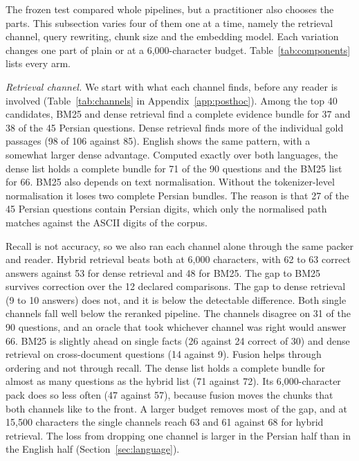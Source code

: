 The frozen test compared whole pipelines, but a practitioner also chooses the parts. This subsection varies four of them one at a time, namely the retrieval channel, query rewriting, chunk size and the embedding model. Each variation changes one part of plain \hybrid{} or \hr{} at a 6,000-character budget. Table~\ref{tab:components} lists every arm.


\emph{Retrieval channel.} We start with what each channel finds, before any reader is involved (Table~\ref{tab:channels} in Appendix~\ref{app:posthoc}). Among the top 40 candidates, BM25 and dense retrieval find a complete evidence bundle for 37 and 38 of the 45 Persian questions. Dense retrieval finds more of the individual gold passages (98 of 106 against 85). English shows the same pattern, with a somewhat larger dense advantage. Computed exactly over both languages, the dense list holds a complete bundle for 71 of the 90 questions and the BM25 list for 66. BM25 also depends on text normalisation. Without the tokenizer-level normalisation it loses two complete Persian bundles. The reason is that 27 of the 45 Persian questions contain Persian digits, which only the normalised path matches against the ASCII digits of the corpus.

Recall is not accuracy, so we also ran each channel alone through the same packer and reader. Hybrid retrieval beats both at 6,000 characters, with 62 to 63 correct answers against 53 for dense retrieval and 48 for BM25. The gap to BM25 survives correction over the 12 declared comparisons. The gap to dense retrieval (9 to 10 answers) does not, and it is below the detectable difference. Both single channels fall well below the reranked pipeline. The channels disagree on 31 of the 90 questions, and an oracle that took whichever channel was right would answer 66. BM25 is slightly ahead on single facts (26 against 24 correct of 30) and dense retrieval on cross-document questions (14 against 9). Fusion helps through ordering and not through recall. The dense list holds a complete bundle for almost as many questions as the hybrid list (71 against 72). Its 6,000-character pack does so less often (47 against 57), because fusion moves the chunks that both channels like to the front. A larger budget removes most of the gap, and at 15,500 characters the single channels reach 63 and 61 against 68 for hybrid retrieval. The loss from dropping one channel is larger in the Persian half than in the English half (Section~\ref{sec:language}).

